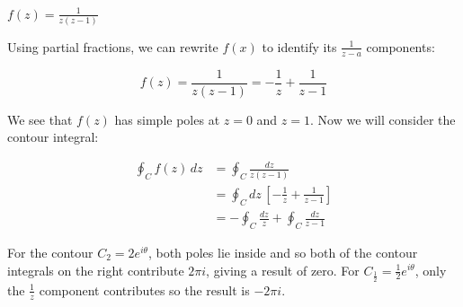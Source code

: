 \documentclass{../../physics_notes}
\begin{document}
\begin{example}{$f(z) = \frac{1}{z(z-1)}$}

Using partial fractions, we can rewrite $f(x)$ to identify its $\frac{1}{z-a}$ components:

\[ f(z) = \frac{1}{z(z-1)} = -\frac{1}{z} + \frac{1}{z-1} \]

We see that $f(z)$ has simple poles at $z = 0$ and $z = 1$. Now we will consider the contour integral:

\begin{align*}
	\oint_C f(z)\, dz &= \oint_C \frac{dz}{z(z-1)} \\
	&= \oint_C dz\,\left[-\frac{1}{z}+\frac{1}{z-1}\right] \\
	&= -\oint_C \frac{dz}{z} + \oint_C \frac{dz}{z-1}
\end{align*}

For the contour $C_2 = 2e^{i\theta}$, both poles lie inside and so both of the contour integrals on the right contribute $2\pi i$, giving a result of zero. For $C_\frac{1}{2} = \frac{1}{2}e^{i\theta}$, only the $\frac{1}{z}$ component contributes so the result is $-2\pi i$.

\end{example}
\end{document}
